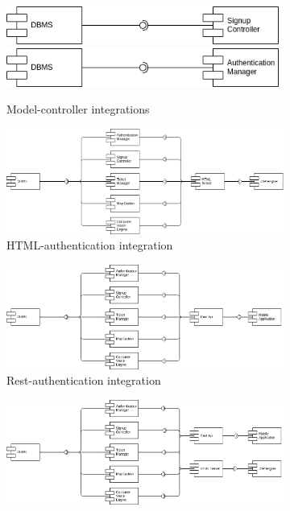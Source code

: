 \documentclass{article}
\begin{document}
	\begin{figure}[h]
		\caption{Authentication Integration}
		\centering
		\label{fig:integrationAuthentication}
		\begin{subfigure}[H]{\linewidth}
			\includegraphics[width=.5\linewidth]{images/integrationAuthentication_1.png}
			\includegraphics[width=.5\linewidth]{images/integrationAuthentication_2.png}
			\caption{Model-controller integrations}
		\end{subfigure}
		\begin{subfigure}[H]{.49\linewidth}
			\includegraphics[width=\linewidth]{images/integrationAuthentication_3.png}
			\caption{HTML-authentication integration}
		\end{subfigure}
		\begin{subfigure}[H]{.49\linewidth}
			\includegraphics[width=\linewidth]{images/integrationAuthentication_4.png}
			\caption{Rest-authentication integration}
		\end{subfigure}
		\begin{subfigure}[H]{\linewidth}
			\includegraphics[width=\linewidth]{images/integrationAuthentication_5.png}

\end{subfigure}
\end{figure}
\end{document}
